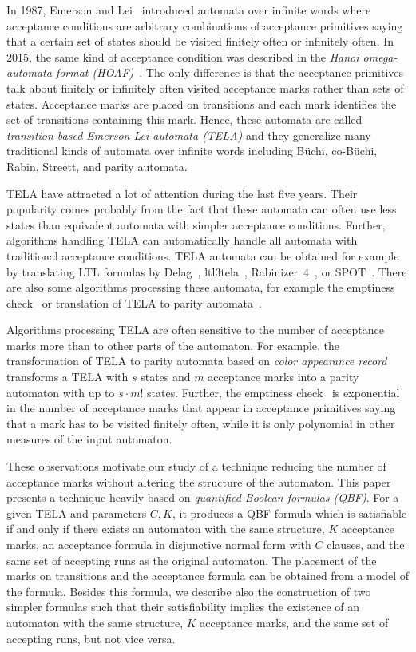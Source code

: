 \documentclass[a4paper,UKenglish,cleveref, autoref, thm-restate]{lipics-v2021}
\begin{document}
In 1987, Emerson and Lei~\cite{emerson.87.scp} introduced automata
over infinite words where acceptance conditions are arbitrary
combinations of acceptance primitives saying that a certain set of
states should be visited finitely often or infinitely often. In 2015,
the same kind of acceptance condition was described in the \emph{Hanoi
  omega-automata format (HOAF)}~\cite{babiak.15.cav}. The only
difference is that the acceptance primitives talk about finitely or
infinitely often visited acceptance marks rather than sets of states.
Acceptance marks are placed on transitions and each mark identifies
the set of transitions containing this mark. Hence, these automata are
called \emph{transition-based Emerson-Lei automata (TELA)} and they
generalize many traditional kinds of automata over infinite words
including Büchi, co-Büchi, Rabin, Streett, and parity automata.

TELA have attracted a lot of attention during the last five years.
Their popularity comes probably from the fact that these automata can
often use less states than equivalent automata with simpler acceptance
conditions. Further, algorithms handling TELA can automatically handle
all automata with traditional acceptance conditions. TELA automata can
be obtained for example by translating LTL formulas by
Delag~\cite{muller.17.gandalf}, ltl3tela~\cite{major.19.atva},
Rabinizer~4~\cite{kretinsky.18.cav}, or
SPOT~\cite{duret.16.atva2}. There are also some algorithms processing
these automata, for example the emptiness check~\cite{baier.19.atva}
or translation of TELA to parity
automata~\cite{renkin.20.atva,casares.22.tacas}.

Algorithms processing TELA are often sensitive to the number of
acceptance marks more than to other parts of the automaton. For
example, the transformation of TELA to parity automata based on
\emph{color appearance record}~\cite{renkin.20.atva} transforms a TELA
with $s$ states and $m$ acceptance marks into a parity automaton with
up to $s\cdot m!$ states. Further, the emptiness
check~\cite{baier.19.atva} is exponential in the number of acceptance
marks that appear in acceptance primitives saying that a mark has to
be visited finitely often, while it is only polynomial in other
measures of the input automaton.

These observations motivate our study of a technique reducing the
number of acceptance marks without altering the structure of the
automaton. This paper presents a technique heavily based on
\emph{quantified Boolean formulas (QBF)}. For a given TELA and
parameters $C,K$, it produces a QBF formula which is satisfiable if
and only if there exists an automaton with the same structure, $K$
acceptance marks, an acceptance formula in disjunctive normal form
with $C$ clauses, and the same set of accepting runs as the original
automaton. The placement of the marks on transitions and the
acceptance formula can be obtained from a model of the
formula. Besides this formula, we describe also the construction of
two simpler formulas such that their satisfiability implies the
existence of an automaton with the same structure, $K$ acceptance
marks, and the same set of accepting runs, but not vice versa.
\end{document}
